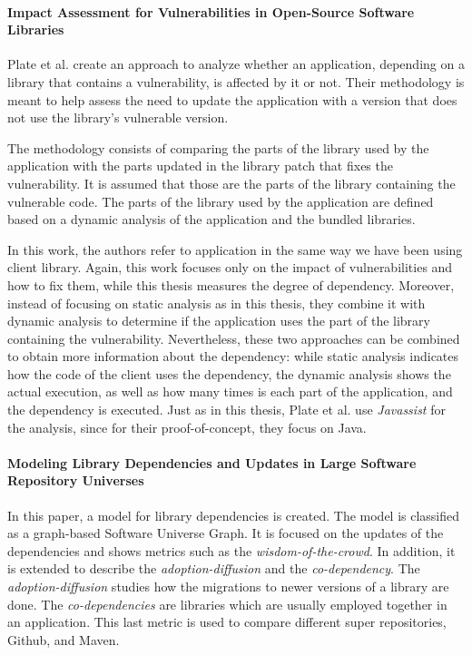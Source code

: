 \paragraph{Impact Assessment for Vulnerabilities in Open-Source Software Libraries \cite{plate2015impact}}
Plate et al. create an approach to analyze whether an application, depending on a library that contains a vulnerability, is affected by it or not. Their methodology is meant to help assess the need to update the application with a version that does not use the library's vulnerable version.

The methodology consists of comparing the parts of the library used by the application with the parts updated in the library patch that fixes the vulnerability. It is assumed that those are the parts of the library containing the vulnerable code. The parts of the library used by the application are defined based on a dynamic analysis of the application and the bundled libraries.

In this work, the authors refer to application in the same way we have been using client library. Again, this work focuses only on the impact of vulnerabilities and how to fix them, while this thesis measures the degree of dependency. Moreover, instead of focusing on static analysis as in this thesis, they combine it with dynamic analysis to determine if the application uses the part of the library containing the vulnerability. Nevertheless, these two approaches can be combined to obtain more information about the dependency: while static analysis indicates how the code of the client uses the dependency, the dynamic analysis shows the actual execution, as well as how many times is each part of the application, and the dependency is executed. Just as in this thesis, Plate et al. use \textit{Javassist} for the analysis, since for their proof-of-concept, they focus on Java.

\paragraph{Modeling Library Dependencies and Updates in Large Software Repository Universes \cite{Kula2017}}

In this paper, a model for library dependencies is created. The model is classified as a graph-based Software Universe Graph. It is focused on the updates of the dependencies and shows metrics such as the \textit{wisdom-of-the-crowd}. In addition, it is extended to describe the \textit{adoption-diffusion} and the \textit{co-dependency}. The \textit{adoption-diffusion} studies how the migrations to newer versions of a library are done. The \textit{co-dependencies} are libraries which are usually employed together in an application. This last metric is used to compare different super repositories, Github, and Maven.

